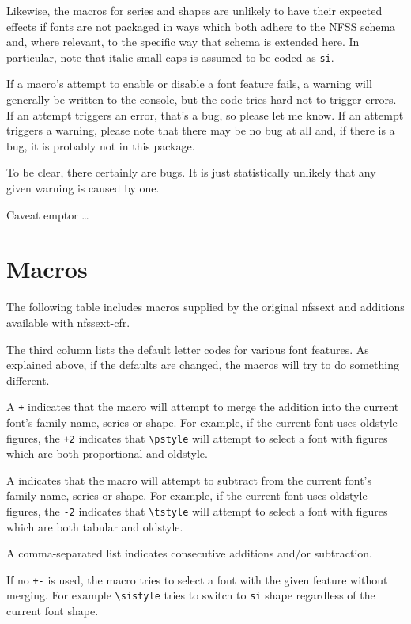 \documentclass[pagesize=auto, fontsize=10pt, DIV=11]{scrartcl}
\newcommand*{\pkg}[1]{\mbox{\textsf{#1}}}
\newcommand*{\cs}[1]{\texttt{\textbackslash #1}}
\begin{document}
Likewise, the macros for series and shapes are unlikely to have their expected effects if fonts are not packaged in ways which both adhere to the NFSS schema and, where relevant, to the specific way that schema is extended here.
In particular, note that italic small-caps is assumed to be coded as \texttt{si}.

If a macro's attempt to enable or disable a font feature fails, a warning will generally be written to the console, but the code tries hard not to trigger errors.
If an attempt triggers an error, that's a bug, so please let me know.
If an attempt triggers a warning, please note that there may be no bug at all and, if there is a bug, it is probably not in this package.

To be clear, there certainly are bugs.
It is just statistically unlikely that any given warning is caused by one.

{%
  \selectfont\Large Caveat emptor \dots\par
}

\section*{Macros}

The following table includes macros supplied by the original \pkg{nfssext} and additions available with \pkg{nfssext-cfr}.

The third column lists the default letter codes for various font features.
As explained above, if the defaults are changed, the macros will try to do something different.

A \texttt{+} indicates that the macro will attempt to merge the addition into the current font's family name, series or shape.
For example, if the current font uses oldstyle figures, the \texttt{+2} indicates that \cs{pstyle} will attempt to select a font with figures which are both proportional and oldstyle.

A \textt{-} indicates that the macro will attempt to subtract from the current font's family name, series or shape.
For example, if the current font uses oldstyle figures, the \texttt{-2} indicates that \cs{tstyle} will attempt to select a font with figures which are both tabular and oldstyle.

A comma-separated list indicates consecutive additions and/or subtraction.

If no \texttt{+-} is used, the macro tries to select a font with the given feature without merging.
For example \cs{sistyle} tries to switch to \texttt{si} shape regardless of the current font shape.
\end{document}
